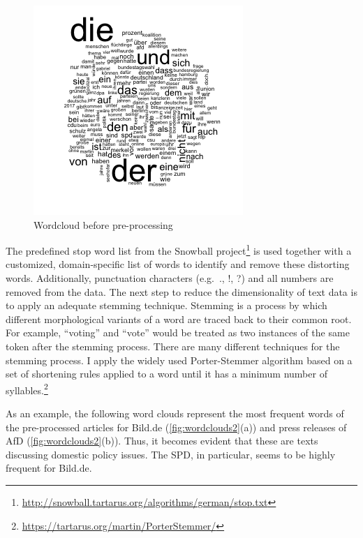 \documentclass[
]{article}
\begin{document}
\begin{figure}

{\centering \includegraphics[width=0.4\linewidth]{../figs/wordcloud} 

}

\caption{Wordcloud before pre-processing \label{fig:wordcloud1}}\label{fig:wordcloud pre-processing}
\end{figure}

The predefined stop word list from the Snowball project\footnote{\url{http://snowball.tartarus.org/algorithms/german/stop.txt}}
is used together with a customized, domain-specific list of words to
identify and remove these distorting words. Additionally, punctuation
characters (e.g.~., !, ?) and all numbers are removed from the data. The
next step to reduce the dimensionality of text data is to apply an
adequate stemming technique. Stemming is a process by which different
morphological variants of a word are traced back to their common root.
For example, ``voting'' and ``vote'' would be treated as two instances
of the same token after the stemming process. There are many different
techniques for the stemming process. I apply the widely used
Porter-Stemmer algorithm based on a set of shortening rules applied to a
word until it has a minimum number of syllables.\footnote{\url{https://tartarus.org/martin/PorterStemmer/}}

As an example, the following word clouds represent the most frequent
words of the pre-processed articles for Bild.de
(\autoref{fig:wordclouds2}(a)) and press releases of AfD
(\autoref{fig:wordclouds2}(b)). Thus, it becomes evident that these are
texts discussing domestic policy issues. The SPD, in particular, seems
to be highly frequent for Bild.de.
\end{document}

